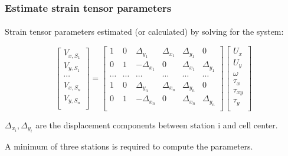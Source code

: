 \begin{frame}
 \frametitle{Estimate strain tensor parameters}
 \framesubtitle{}
 \label{ch2:}
 
 Strain tensor parameters estimated (or calculated) by solving for the system:
 
 \[
  \begin{bmatrix}
    V_{x,S_1} \\ 
    V_{y,S_1} \\ 
    \cdots \\ 
    V_{x,S_n} \\ 
    V_{y,S_n} \\ 
  \end{bmatrix}
  =
  \begin{bmatrix}
    1 & 0 & \Delta_{y_1}  & \Delta_{x_1} & \Delta_{y_1} & 0 \\
    0 & 1 & -\Delta_{x_1} &  0           & \Delta_{x_1} & \Delta_{y_1} \\
    \cdots & \cdots & \cdots & \cdots & \cdots & \cdots \\
    1 & 0 & \Delta_{y_n}  & \Delta_{x_n} & \Delta_{y_n} & 0 \\
    0 & 1 & -\Delta_{x_n} &  0           & \Delta_{x_n} & \Delta_{y_n} \\
  \end{bmatrix}
  \begin{bmatrix}
    U_{x} \\ 
    U_{y} \\ 
    \omega \\ 
    \tau_{x} \\ 
    \tau_{xy} \\ 
    \tau_{y} \\ 
  \end{bmatrix}
  \]
  
  $\Delta_{x_i}, \Delta_{y_i}$ are the displacement components between station i and cell center.
  
  A minimum of three stations is required to compute the parameters.
  

\end{frame}
\note{}

